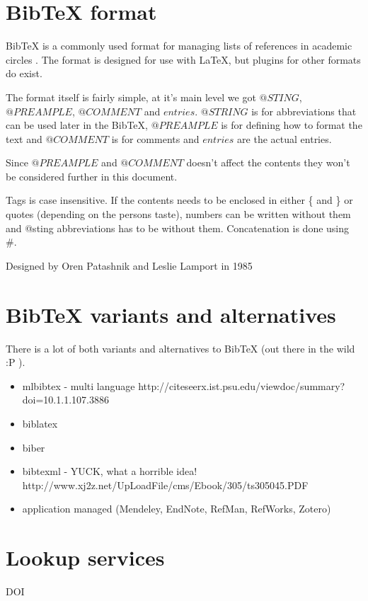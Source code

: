 \section{Bib{\TeX} format}
Bib{\TeX} is a commonly used format for managing lists of references in
academic circles .  The format is
designed for use with {\LaTeX}, but plugins for other formats do
exist\cite{bibtex_resource}.

The format itself is fairly simple, at it's main level we got
$@STING$, $@PREAMPLE$, $@COMMENT$ and $entries$.  $@STRING$ is for
abbreviations that can be used later in the Bib{\TeX}, $@PREAMPLE$ is for
defining how to format the text and $@COMMENT$ is for comments and
$entries$ are the actual entries\cite{bibtex_resource}.

Since $@PREAMPLE$ and $@COMMENT$ doesn't affect the contents they
won't be considered further in this document. 

Tags is case insensitive. If the contents needs to be enclosed in
either \{ and \} or quotes (depending on the persons taste), numbers
can be written without them and @sting abbreviations has to be without
them. Concatenation is done using \#.\cite{bibtex_resource}

Designed by Oren Patashnik and Leslie Lamport in 1985




\section{BibTeX variants and alternatives}
There is a lot of both variants and alternatives to BibTeX (out there in the wild :P ).

\begin{itemize}
\item mlbibtex - multi language\newline
      http://citeseerx.ist.psu.edu/viewdoc/summary?doi=10.1.1.107.3886
\item biblatex
\item biber
\item bibtexml - YUCK, what a horrible idea!\newline
      http://www.xj2z.net/UpLoadFile/cms/Ebook/305/ts305045.PDF
\item application managed \newline
      (Mendeley, EndNote, RefMan, RefWorks, Zotero)
\end{itemize}

\section{Lookup services}
DOI

